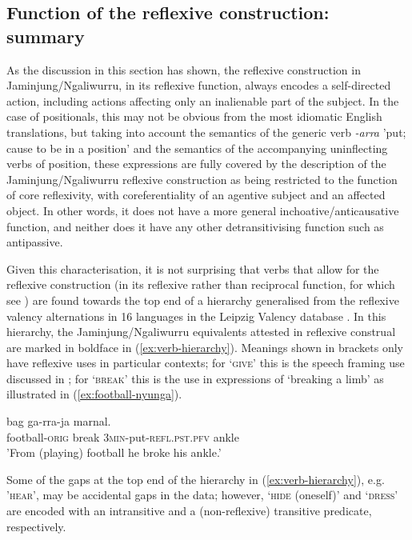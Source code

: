 \documentclass[output=paper,colorlinks,citecolor=brown]{langscibook}
\begin{document}
\subsection{Function of the reflexive construction: summary} \label{sec:SchultzeBernd:4.4}

As the discussion in this section has shown, the reflexive construction in Jaminjung/Ngaliwurru, in its reflexive function, always encodes a self-directed action, including actions affecting only an inalienable part of the subject. In the case of positionals, this may not be obvious from the most idiomatic English translations, but taking into account the semantics of the generic verb \textit{-arra} 'put; cause to be in a position' and the semantics of the accompanying uninflecting verbs of position, these expressions are fully covered by the description of the Jaminjung/Ngaliwurru reflexive construction as being restricted to the function of core reflexivity, with coreferentiality of an agentive subject and an affected object. In other words, it does not have a more general inchoative/anticausative function, and neither does it have any other detransitivising function such as antipassive. 

Given this characterisation, it is not surprising that verbs that allow for the reflexive construction (in its reflexive rather than reciprocal function, for which see ) are found towards the top end of a hierarchy \citep{Wichmann2015} generalised from the reflexive valency alternations in 16 languages in the Leipzig Valency database \citep{HartmannEtAl2013}. In this hierarchy, the Jaminjung/Ngaliwurru equivalents attested in reflexive construal are marked in boldface in (\ref{ex:verb-hierarchy}). Meanings shown in brackets only have reflexive uses in particular contexts; for `\textsc{give}' this is the speech framing use discussed in ; for `\textsc{break}' this is the use in expressions of `breaking a limb' as illustrated in (\ref{ex:football-nyunga}). 

\ea
{} {bag} {ga-rra-ja} {marnal.} \\
football-\textsc{orig} break \textsc{3min}-put-\textsc{refl.pst.pfv} ankle \\
\glt 'From (playing) football he broke his ankle.’
\label{ex:football-nyunga}
\z

Some of the gaps at the top end of the hierarchy in (\ref{ex:verb-hierarchy}), e.g. '\textsc{hear}', may be accidental gaps in the data; however, `\textsc{hide} (oneself)' and `\textsc{dress}' are encoded with an intransitive and a (non-reflexive) transitive predicate, respectively. 
\end{document}
